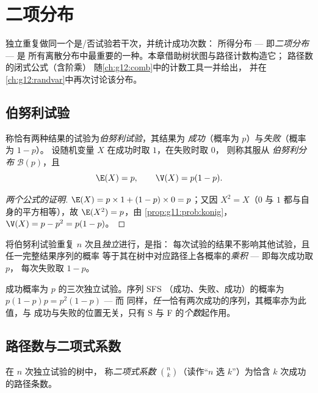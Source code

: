 \chapter{二项分布}\label{ch:g11:binom}

独立重复做同一个是/否试验若干次，并统计成功次数：
所得分布 --- 即\emph{二项分布} --- 是
所有离散分布中最重要的一种。本章借助树状图与路径计数构造它；
路径数的闭式公式（含阶乘）
随\cref{ch:g12:comb}中的计数工具一并给出，
并在\cref{ch:g12:randvar}中再次讨论该分布。

\section{伯努利试验}

\begin{definition}[伯努利试验]\label{def:g11:binom:bernoulli}
称恰有两种结果的试验为\emph{伯努利试验}，其结果为
\emph{成功}（概率为 $p$）与\emph{失败}（概率为 $1 - p$）。
设随机变量 $X$ 在成功时取 $1$，在失败时取 $0$，
则称其服从
\emph{伯努利分布} $\mathcal B(p)$，且
\[
\E(X) = p,
\qquad
\V(X) = p(1 - p).
\]
\end{definition}

\begin{proof}[两个公式的证明]
$\E(X) = p \times 1 + (1-p) \times 0 = p$；又因 $X^2 = X$（$0$
与 $1$ 都与自身的平方相等），故 $\E(X^2) = p$，由
\cref{prop:g11:prob:konig}，$\V(X) = p - p^2 = p(1-p)$。
\end{proof}

\begin{definition}[重复独立试验]\label{def:g11:binom:repeated}
将伯努利试验重复 $n$ 次且\emph{独立}进行，是指：
每次试验的结果不影响其他试验，且任一完整结果序列的概率
等于其在树中对应路径上各概率的\emph{乘积} ---
即每次成功取 $p$，
每次失败取 $1 - p$。
\end{definition}

\begin{example}\label{ex:g11:binom:threetrials}
成功概率为 $p$ 的三次独立试验。序列 SFS
（成功、失败、成功）的概率为 $p(1-p)p = p^2(1-p)$ --- 而
同样，\emph{任一}恰有两次成功的序列，其概率亦为此值，与
成功与失败的位置无关，只有 S 与 F 的\emph{个数}起作用。
\end{example}

\section{路径数与二项式系数}

\begin{definition}[二项式系数]\label{def:g11:binom:coefficient}
在 $n$ 次独立试验的树中，
称\emph{二项式系数} $\binom{n}{k}$（读作“$n$
选 $k$”）为恰含 $k$ 次成功的路径条数。
\end{definition}

